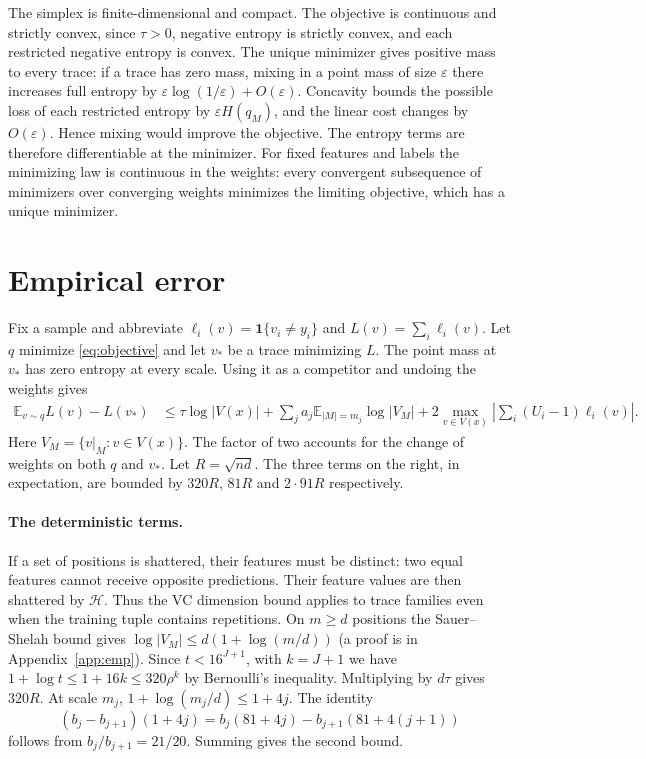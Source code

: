 \documentclass[11pt]{article}
\theoremstyle{definition}\newtheorem{definition}[theorem]{Definition}
\newcommand{\E}{\mathbb E}
\newcommand{\HH}{\mathcal H}
\newcommand{\ind}{\mathbf 1}
\begin{document}
The simplex is finite-dimensional and compact. The objective is continuous
and strictly convex, since $\tau>0$, negative entropy is strictly convex,
and each restricted negative entropy is convex. The unique minimizer gives
positive mass to every trace: if a trace has zero mass, mixing in a point
mass of size $\varepsilon$ there increases full entropy by
$\varepsilon\log(1/\varepsilon)+O(\varepsilon)$. Concavity bounds the possible
loss of each restricted entropy by $\varepsilon H(q_M)$, and the linear cost
changes by $O(\varepsilon)$. Hence mixing would improve the objective.
The entropy terms are therefore differentiable at the minimizer. For fixed features and labels the minimizing law is continuous in
the weights: every convergent subsequence of minimizers over converging
weights minimizes the limiting objective, which has a unique minimizer.

\section{Empirical error}\label{sec:accuracy}
Fix a sample and abbreviate $\ell_i(v)=\ind\{v_i\ne y_i\}$ and
$L(v)=\sum_i\ell_i(v)$. Let $q$ minimize \eqref{eq:objective} and let $v_*$ be
a trace minimizing $L$. The point mass at $v_*$ has zero entropy at every
scale. Using it as a competitor and undoing the weights gives
\begin{align}
 \E_{v\sim q}L(v)-L(v_*)&\le
  \tau\log|V(x)|+\sum_j a_j\E_{|M|=m_j}\log|V_M|
      +2\max_{v\in V(x)}\left|\sum_i(U_i-1)\ell_i(v)\right| .
 \label{eq:accbudget}
\end{align}
Here $V_M=\{v|_M:v\in V(x)\}$. The factor of two accounts for the change of weights on both $q$
and $v_*$. Let $R=\sqrt{nd}$. The three terms on the right, in expectation,
are bounded by $320R$, $81R$ and $2\cdot91R$ respectively.

\paragraph{The deterministic terms.}
If a set of positions is shattered, their features must be distinct:
two equal features cannot receive opposite predictions. Their feature values
are then shattered by $\HH$. Thus the VC dimension bound applies to trace
families even when the training tuple contains repetitions.
On $m\ge d$ positions the Sauer--Shelah bound \cite{sauer} gives
$\log |V_M|\le d(1+\log(m/d))$ (a proof is in Appendix~\ref{app:emp}).
Since $t<16^{J+1}$, with $k=J+1$ we have
$1+\log t\le1+16k\le320\rho^k$ by Bernoulli's inequality. Multiplying
by $d\tau$ gives $320R$. At scale $m_j$, $1+\log(m_j/d)\le1+4j$.
The identity
\[
 (b_j-b_{j+1})(1+4j)=b_j(81+4j)-b_{j+1}(81+4(j+1))
\]
follows from $b_j/b_{j+1}=21/20$. Summing gives the second bound.
\end{document}
